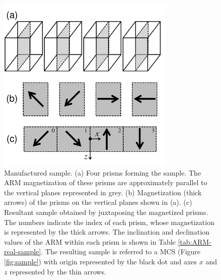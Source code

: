 \documentclass[galley,gc]{agutex}
\begin{document}
 \begin{figure}
 \noindent \includegraphics[width=20pc]{Figs/Fig13_HQ.pdf}
 \caption{Manufactured sample. 
 (a) Four prisms forming the sample. The ARM magnetization of these
 prisms are approximately parallel to the vertical planes represented
 in grey.
 (b) Magnetization (thick arrows) of the prisms on the vertical 
 planes shown in (a).
 (c) Resultant sample obtained by juxtaposing the magnetized prisms.
 The numbers indicate the index of each prism, whose magnetization
 is represented by the thick arrows. The inclination and declination
 values of the ARM within each prism is shown in Table 
 \ref{tab:ARM-real-sample}.
 The resulting sample is referred to a MCS (Figure \ref{fig:sample}) 
 with origin represented by the black dot and axes $x$ and $z$ 
 represented by the thin arrows.}
 \label{fig:real-sample}
 \end{figure}
\end{document}
